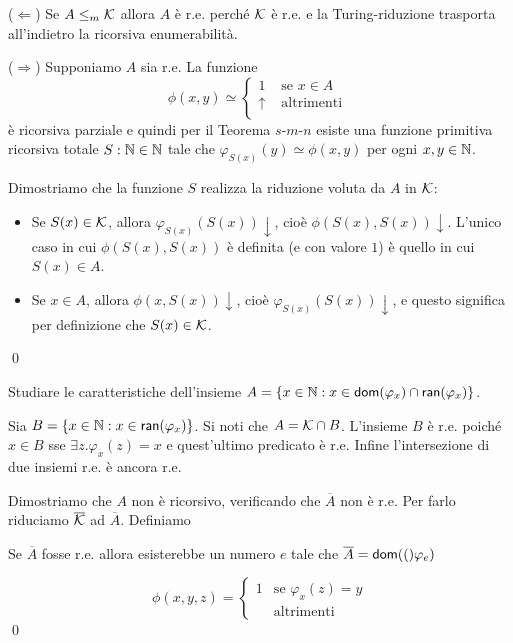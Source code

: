 \documentclass[runningheads,a4paper]{llncs}
\begin{document}
\begin{solution}
\noindent($\Leftarrow$) Se $A \leq_m \mathcal{K}$ allora $A$ \`{e} r.e. perch\'{e} $\mathcal{K}$ \`{e} r.e. e la Turing-riduzione trasporta all'indietro la ricorsiva enumerabilit\`{a}.

\noindent($\Rightarrow$) Supponiamo $A$ sia r.e. La funzione
$$
\phi(x,y) \simeq
\begin{cases}
1              & \text{ se } x \in A \\
\uparrow  & \text{ altrimenti } \\
\end{cases}
$$
\`{e} ricorsiva parziale e quindi per il Teorema $s$-$m$-$n$ esiste una funzione primitiva ricorsiva totale $S: \mathbb{N} \in \mathbb{N}$ tale che $\varphi_{S(x)}(y) \simeq \phi(x,y)$ per ogni $x,y\in \mathbb{N}$.

Dimostriamo che la funzione $S$ realizza la riduzione voluta da $A$ in $\mathcal{K}$:
\begin{itemize}
\item Se $S(x) \in \mathcal{K}$, allora $\varphi_{S(x)}(S(x))\downarrow$, cio\`{e} $\phi(S(x),S(x))\downarrow$. L'unico caso in cui $\phi(S(x),S(x))$ \`{e} definita (e con valore $1$) \`{e} quello in cui $S(x) \in A$.
\item Se $x \in A$, allora $\phi(x,S(x))\downarrow$, cio\`{e} $\varphi_{S(x)}(S(x))\downarrow$, e questo significa per definizione che $S(x) \in \mathcal{K}$.
\end{itemize}
\qed
\end{solution}

\begin{exercise}
Studiare le caratteristiche dell'insieme $A = \{x \in \mathbb{N} : x \in \mathsf{dom}(\varphi_x) \cap \mathsf{ran}(\varphi_x)\}$.
\end{exercise}

\begin{solution}
Sia $B = \{x \in \mathbb{N} : x \in \mathsf{ran}(\varphi_x)\}$. Si noti che $A = \mathcal{K} \cap B$.  L'insieme $B$ \`{e} r.e. poich\'{e} $x \in B$ sse $\exists z. \varphi_x(z) = x$ e quest'ultimo predicato \`{e} r.e. Infine l'intersezione di due insiemi r.e. \`{e} ancora r.e.

Dimostriamo che $A$ non \`{e} ricorsivo, verificando che $\overline{A}$ non \`{e} r.e. Per farlo riduciamo $\overline{\mathcal{K}}$ ad $\overline{A}$. Definiamo

Se $\overline{A}$ fosse r.e. allora esisterebbe un numero $e$ tale che $\overline{A} = \mathsf{dom}(()\varphi_e)$

$$
\phi(x,y,z) = 
\begin{cases}
1 & \text{se } \varphi_x(z) = y \\
   & \text{altrimenti}
\end{cases}
$$
\qed
\end{solution}
\end{document}
